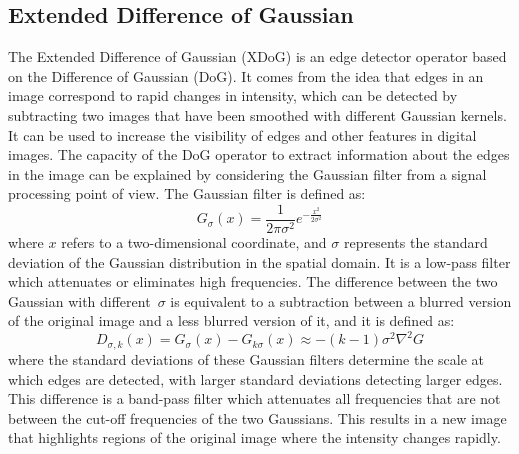 \subsection{Extended Difference of Gaussian}
The Extended Difference of Gaussian (XDoG) is an edge detector operator based on the Difference of Gaussian (DoG). It comes from the idea that edges in an image correspond to rapid changes in intensity, which can be detected by subtracting two images that have been smoothed with different Gaussian kernels. It can be used to increase the visibility of edges and other features in digital images.
The capacity of the DoG operator to extract information about the edges in the image can be explained by considering the Gaussian filter from a signal processing point of view. The Gaussian filter is defined as: 
\begin{equation}
    G_{\sigma}(x)=\frac{1}{2\pi \sigma^2}e^{-\frac{x^2}{2\sigma^2}}
\end{equation}
where $x$ refers to a two-dimensional coordinate, and $\sigma$ represents the standard deviation of the Gaussian distribution in the spatial domain. It is a low-pass filter which attenuates or eliminates high frequencies. The difference between the two Gaussian with different $\sigma$ is equivalent to a subtraction between a blurred version of the original image and a less blurred version of it, and it is defined as: 
 \begin{equation}
     D_{\sigma, k}(x)=G_{\sigma}(x)-G_{k\sigma}(x) \approx -(k-1)\sigma^2 \nabla ^2 G
 \end{equation}
where the standard deviations of these Gaussian filters determine the scale at which edges are detected, with larger standard deviations detecting larger edges.
This difference is a band-pass filter which attenuates all frequencies that are not between the cut-off frequencies of the two Gaussians. This results in a new image that highlights regions of the original image where the intensity changes rapidly.

